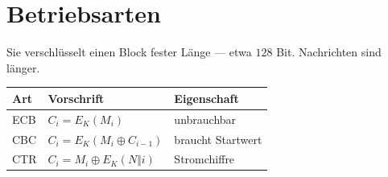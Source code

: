 \section{Betriebsarten}

\begin{merksatz}
Sie verschlüsselt einen Block fester Länge --- etwa $128$ Bit. Nachrichten sind länger.

\begin{center}
{\small
\renewcommand{\arraystretch}{1.55}
\begin{tabular}{@{}P{1.8cm}P{3.0cm}P{3.6cm}@{}}
\toprule
\textbf{Art} & \textbf{Vorschrift} & \textbf{Eigenschaft}\\
\midrule
ECB & $C_i = E_K(M_i)$ & \textcolor{akzent}{unbrauchbar}\\
CBC & $C_i = E_K(M_i\oplus C_{i-1})$ & braucht Startwert\\
CTR & $C_i = M_i\oplus E_K(N\Vert i)$ & Stromchiffre\\
\bottomrule
\end{tabular}}
\end{center}
\end{merksatz}

